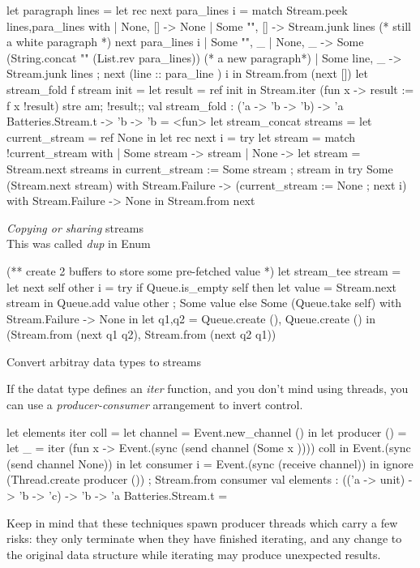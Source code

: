 \begin{ocamlcode}
let paragraph lines =
  let rec next para_lines i =
    match Stream.peek lines,para_lines with
    | None, [] -> None
    | Some "", [] ->
      Stream.junk lines (* still a white paragraph *)
      next para_lines i
    | Some "", _ | None, _ ->
      Some (String.concat "\n" (List.rev para_lines)) (* a new paragraph*)
    | Some line, _ ->
      Stream.junk lines ;
      next (line :: para_line ) i in
  Stream.from (next [])    
let stream_fold f stream init = 
    let result = ref init in 
    Stream.iter (fun x -> result := f x !result) stre  am; !result;;
val stream_fold : ('a -> 'b -> 'b) -> 'a Batteries.Stream.t -> 'b -> 'b =
  <fun>
let stream_concat streams = 
  let current_stream = ref None in 
  let rec next i = 
    try 
      let stream = match !current_stream with 
        | Some stream -> stream 
        | None -> 
          let stream = Stream.next streams in 
          current_stream := Some stream ; 
          stream in 
      try Some (Stream.next stream)
      with Stream.Failure -> (current_stream := None ; next i)
    with Stream.Failure -> None in 
  Stream.from next
\end{ocamlcode}

\textit{Copying or sharing} streams \\
  This was called \textit{dup} in Enum
  \begin{ocamlcode}
(** create 2 buffers to store some pre-fetched value *)
let stream_tee stream = 
  let next self other i = 
    try 
      if Queue.is_empty self 
      then 
        let value = Stream.next stream in 
        Queue.add value other ;
        Some value
      else 
        Some (Queue.take self)
    with Stream.Failure -> None in 
  let q1,q2 = Queue.create (), Queue.create () in 
  (Stream.from (next q1 q2), Stream.from (next q2 q1))
\end{ocamlcode}

Convert arbitray data types to streams 


If the datat type defines an \textit{iter} function, and you don't
mind using threads, you can use a \textit{producer-consumer}
arrangement to invert control.

\begin{ocamlcode}
let elements iter coll = 
  let channel = Event.new_channel () in 
  let producer () = 
    let _ = iter (fun x -> Event.(sync (send channel (Some x )))) coll in 
    Event.(sync (send channel None)) in 
  let consumer i = 
    Event.(sync (receive channel)) in 
  ignore (Thread.create producer ()) ; 
  Stream.from consumer    
val elements : (('a -> unit) -> 'b -> 'c) -> 'b -> 'a Batteries.Stream.t =    
\end{ocamlcode}

Keep in mind that these techniques spawn producer threads which carry
a few risks: they only terminate when they have finished iterating,
and any change to the original data structure while iterating may
produce unexpected results.



